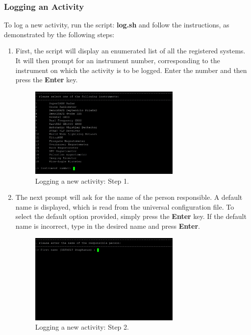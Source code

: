 \subsubsection{Logging an Activity}
To log a new activity, run the script: \textbf{log.sh} and follow the instructions, as demonstrated by the following steps:
\begin{enumerate}
	\item First, the script will display an enumerated list of all the registered systems. It will then prompt for an instrument number, corresponding to the instrument on which the activity is to be logged. Enter the number and then press the \textbf{Enter} key.
		\begin{figure}[H]
			\centering
			\includegraphics[width=0.7\textwidth]{images/operations/logger_1.jpg}
			\caption{Logging a new activity: Step 1.}
			\label{fig:ops_log1}
		\end{figure}
	\newpage
	\item The next prompt will ask for the name of the person responsible. A default name is displayed, which is read from the universal configuration file. To select the default option provided, simply press the \textbf{Enter} key. If the default name is incorrect, type in the desired name and press \textbf{Enter}.
		\begin{figure}[H]
			\centering
			\includegraphics[width=0.7\textwidth]{images/operations/logger_2.jpg}
			\caption{Logging a new activity: Step 2.}

\end{figure}
\end{enumerate}
